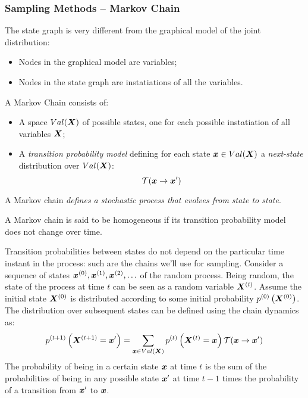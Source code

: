 \subsubsection{Sampling Methods -- Markov Chain}
The state graph is very different from the graphical model of the joint distribution:
\begin{itemize}
  \item Nodes in the graphical model are variables;
  \item Nodes in the state graph are instatiations of all the variables.
\end{itemize}
\begin{definition}
  A Markov Chain consists of:
  \begin{itemize}
    \item A space $Val(\bm{X})$ of possible states, one for each possible instatiation of all variables $\bm{X}$;
    \item A \textit{transition probability model} defining for each state $\bm{x}\in Val(\bm{X})$ a \textit{next-state} distribution over $Val(\bm{X})$:
      \[\mathcal{T}(\bm{x}\rightarrow \bm{x}')\]
  \end{itemize}
\end{definition}
A Markov chain \textit{defines a stochastic process that evolves from state to state}. 
\begin{definition}
  A Markov chain is said to be homogeneous if its transition probability model does not change over time.
\end{definition}
Transition probabilities between states do not depend on the particular time instant in the process: such are the chains we'll use for sampling. \newline
Consider a sequence of states $\bm{x}^{(0)},\bm{x}^{(1)},\bm{x}^{(2)},\hdots$ of the random process. \newline
Being random, the state of the process at time $t$ can be seen as a random variable $\bm{X}^{(t)}$. Assume the initial state $\bm{X}^{(0)}$ is distributed according to some initial probability $p^{(0)}\left(\bm{X}^{(0)}\right)$. The distribution over subsequent states can be defined using the chain dynamics as:
\[p^{(t+1)}\left(\bm{X}^{(t+1)}=\bm{x}'\right)=\displaystyle\sum_{\bm{x}\in Val(\bm{X})}p^{(t)}\left(\bm{X}^{(t)}=\bm{x}\right)\mathcal{T}(\bm{x}\rightarrow\bm{x}')\]
The probability of being in a certain state $\bm{x}$ at time $t$ is the sum of the probabilities of being in any possible state $\bm{x}'$ at time $t-1$ times the probability of a transition from $\bm{x}'$ to $\bm{x}$. \newline
